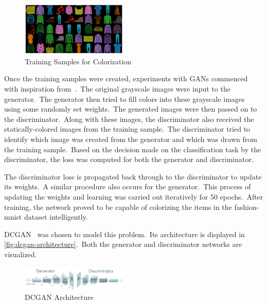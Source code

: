 \documentclass[conference]{IEEEtran}
\begin{document}
    \begin{figure}
        \caption{Training Samples for Colorization}
        \label{fig:colorization}
        \centering
        \includegraphics[width=0.45\textwidth]{Colorization_training_samples.png}
    \end{figure}

    Once the training samples were created, experiments with GANs commenced with inspiration from~\cite{coloringimages}.\ The original grayscale images were input to the generator.\ The generator then tried to fill colors into these grayscale images using some randomly set weights.\ The generated images were then passed on to the discriminator.\ Along with these images, the discriminator also received the statically-colored images from the training sample.\ The discriminator tried to identify which image was created from the generator and which was drawn from the training sample.\ Based on the decision made on the classification task by the discriminator, the loss was computed for both the generator and discriminator.

    The discriminator loss is propagated back through to the discriminator to update its weights.\ A similar procedure also occurs for the generator.\ This process of updating the weights and learning was carried out iteratively for 50 epochs.\ After training, the network proved to be capable of colorizing the items in the fashion-mnist dataset intelligently.

    DCGAN~\cite{radford2016unsupervised,dcgans} was chosen to model this problem.\ Its architecture is displayed in \autoref{fig:dcgan-architecture}.\ Both the generator and discriminator networks are visualized.

    \begin{figure}
        \caption{DCGAN Architecture}
        \label{fig:dcgan-architecture}
        \includegraphics[width=0.45\textwidth]{architecture.png}
        \centering
    \end{figure}
\end{document}
